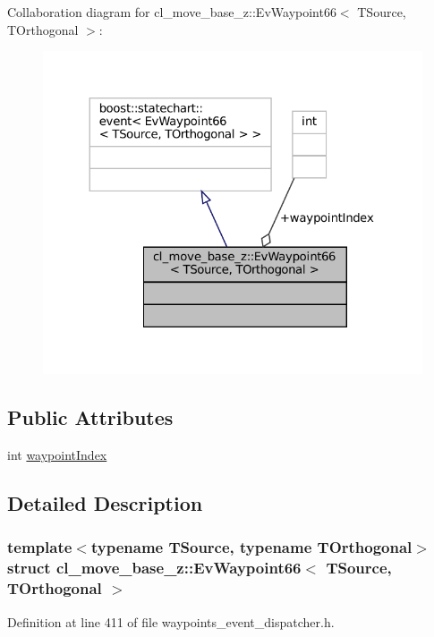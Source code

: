 Collaboration diagram for cl\+\_\+move\+\_\+base\+\_\+z\+:\+:Ev\+Waypoint66$<$ T\+Source, T\+Orthogonal $>$\+:
\nopagebreak
\begin{figure}[H]
\begin{center}
\leavevmode
\includegraphics[width=324pt]{structcl__move__base__z_1_1EvWaypoint66__coll__graph}
\end{center}
\end{figure}
\subsection*{Public Attributes}
\begin{DoxyCompactItemize}
\item 
int \hyperlink{structcl__move__base__z_1_1EvWaypoint66_a7f7b990c18962fa35f1b20b2bf5829aa}{waypoint\+Index}
\end{DoxyCompactItemize}


\subsection{Detailed Description}
\subsubsection*{template$<$typename T\+Source, typename T\+Orthogonal$>$\newline
struct cl\+\_\+move\+\_\+base\+\_\+z\+::\+Ev\+Waypoint66$<$ T\+Source, T\+Orthogonal $>$}



Definition at line 411 of file waypoints\+\_\+event\+\_\+dispatcher.\+h.



